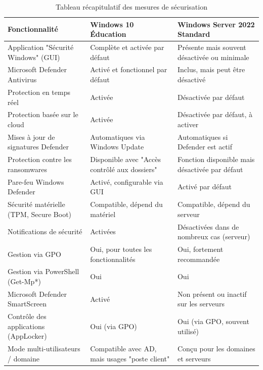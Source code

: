 \begingroup
{}    %
\setlength{\extrarowheight}{3pt}
\begin{table}[h!]
  \centering
  \label{tab:securite}
  \small
  \begin{tabular}{>{\columncolor{firstcol}}p{4cm} p{5cm} p{5cm}}
    \rowcolor{headercolor}
    \textbf{Fonctionnalité} & \textbf{Windows 10 Éducation} & \textbf{Windows Server 2022 Standard} \\
    \hline
    Application "Sécurité Windows" (GUI) & Complète et activée par défaut & Présente mais souvent désactivée ou minimale \\
    Microsoft Defender Antivirus & Activé et fonctionnel par défaut & Inclus, mais peut être désactivé \\
    Protection en temps réel & Activée & Désactivée par défaut \\
    Protection basée sur le cloud & Activée & Désactivée par défaut, à activer \\
    Mises à jour de signatures Defender & Automatiques via Windows Update & Automatiques si Defender est actif \\
    Protection contre les ransomwares & Disponible avec "Accès contrôlé aux dossiers" & Fonction disponible mais désactivée par défaut \\
    Pare-feu Windows Defender & Activé, configurable via GUI & Activé par défaut \\
    Sécurité matérielle (TPM, Secure Boot) & Compatible, dépend du matériel & Compatible, dépend du serveur \\
    Notifications de sécurité & Activées & Désactivées dans de nombreux cas (serveur) \\
    Gestion via GPO & Oui, pour toutes les fonctionnalités & Oui, fortement recommandée \\
    Gestion via PowerShell (Get-Mp*) & Oui & Oui \\
    Microsoft Defender SmartScreen & Activé & Non présent ou inactif sur les serveurs \\
    Contrôle des applications (AppLocker) & Oui (via GPO) & Oui (via GPO, souvent utilisé) \\
    Mode multi-utilisateurs / domaine & Compatible avec AD, mais usages "poste client" & Conçu pour les domaines et serveurs \\
  \end{tabular}
  \caption{Tableau récapitulatif des mesures de sécurisation}
\end{table}
\endgroup

